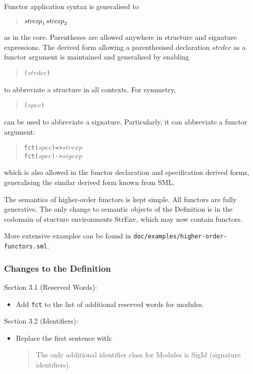 \documentclass[twoside,titlepage]{article}
\begin{document}
\begin{appendix}
Functor application syntax is generalised to
\begin{quote}
\begin{alltt}
\(\mathit{strexp}\sb1\) \(\mathit{strexp}\sb2\)
\end{alltt}
\end{quote}
as in the core. Parentheses are allowed anywhere in structure and signature expressions. The derived form allowing a parenthesised declaration $\mathit{strdec}$ as a functor argument is maintained and generalised by enabling
\begin{quote}
\begin{alltt}
( \(\mathit{strdec}\) )
\end{alltt}
\end{quote}
to abbreviate a structure in all contexts. For symmetry,
\begin{quote}
\begin{alltt}
( \(\mathit{spec}\) )
\end{alltt}
\end{quote}
can be used to abbreviate a signature.
Particularly, it can  abbreviate a functor argument:
\begin{quote}
\begin{alltt}
fct (\(\mathit{spec}\)) => \(\mathit{strexp}\)
fct (\(\mathit{spec}\)) -> \(\mathit{sigexp}\)
\end{alltt}
\end{quote}
which is also allowed in the functor declaration and specification derived forms, generalising the similar derived form known from SML.

The semantics of higher-order functors is kept simple. All functors are fully generative. The only change to semantic objects of the Definition is in the codomain of stucture environments StrEnv, which may now contain functors.

More extensive examples can be found in {\tt doc/examples/higher-order-functors.sml}.

\subsubsection*{Changes to the Definition}

Section 3.1 (Reserved Words):
\begin{itemize}
\item Add {\tt fct} to the list of additional reserved words for modules.
\end{itemize}

Section 3.2 (Identifiers):
\begin{itemize}
\item Replace the first sentence with:
  \begin{quote}
  The only additional identifier class for Modules is SigId (signature identifiers).
  \end{quote}


\end{itemize}
\end{appendix}
\end{document}

